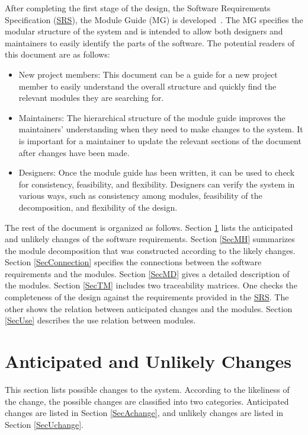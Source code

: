\documentclass[12pt, titlepage]{article}
\begin{document}
After completing the first stage of the design, the Software Requirements
Specification (\href{https://github.com/NicLobo/Capstone-yoGERT/blob/main/docs/SRS/SRS.pdf}{SRS}), the Module Guide (MG) is developed~\citep{ParnasEtAl1984}. The MG
specifies the modular structure of the system and is intended to allow both
designers and maintainers to easily identify the parts of the software.  The
potential readers of this document are as follows:

\begin{itemize}
\item New project members: This document can be a guide for a new project member
  to easily understand the overall structure and quickly find the
  relevant modules they are searching for.
\item Maintainers: The hierarchical structure of the module guide improves the
  maintainers' understanding when they need to make changes to the system. It is
  important for a maintainer to update the relevant sections of the document
  after changes have been made.
\item Designers: Once the module guide has been written, it can be used to
  check for consistency, feasibility, and flexibility. Designers can verify the
  system in various ways, such as consistency among modules, feasibility of the
  decomposition, and flexibility of the design.
\end{itemize}

The rest of the document is organized as follows. Section
\ref{SecChange} lists the anticipated and unlikely changes of the software
requirements. Section \ref{SecMH} summarizes the module decomposition that
was constructed according to the likely changes. Section \ref{SecConnection}
specifies the connections between the software requirements and the
modules. Section \ref{SecMD} gives a detailed description of the
modules. Section \ref{SecTM} includes two traceability matrices. One checks
the completeness of the design against the requirements provided in the \href{https://github.com/NicLobo/Capstone-yoGERT/blob/main/docs/SRS/SRS.pdf}{SRS}. The
other shows the relation between anticipated changes and the modules. Section
\ref{SecUse} describes the use relation between modules.

\section{Anticipated and Unlikely Changes} \label{SecChange}

This section lists possible changes to the system. According to the likeliness
of the change, the possible changes are classified into two
categories. Anticipated changes are listed in Section \ref{SecAchange}, and
unlikely changes are listed in Section \ref{SecUchange}.
\end{document}
